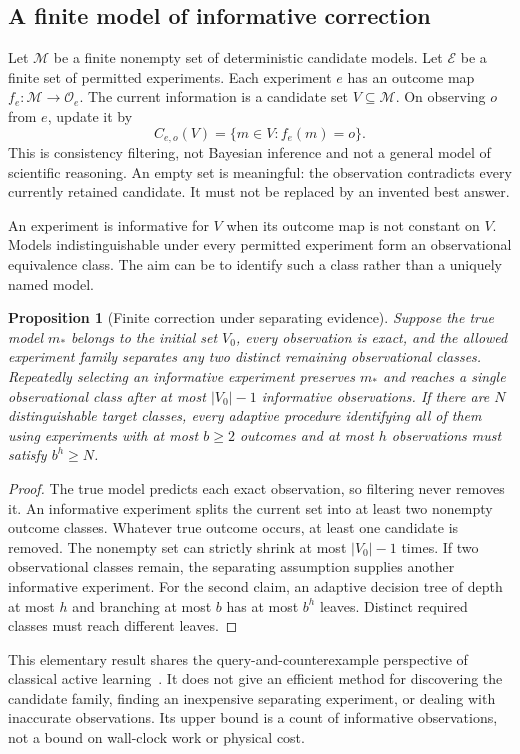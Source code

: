 \documentclass[11pt,letterpaper]{article}
\theoremstyle{plain}
\newtheorem{proposition}[theorem]{Proposition}
\theoremstyle{definition}
\newcommand{\M}{\mathcal M}\newcommand{\E}{\mathbb E}
\begin{document}
\subsection{A finite model of informative correction}
Let $\M$ be a finite nonempty set of deterministic candidate models. Let $\mathcal E$ be a finite set of permitted experiments. Each experiment $e$ has an outcome map $f_e:\M\to\mathcal O_e$. The current information is a candidate set $V\subseteq\M$. On observing $o$ from $e$, update it by
\begin{equation}\label{eq:filter}
C_{e,o}(V)=\{m\in V:f_e(m)=o\}.
\end{equation}
This is consistency filtering, not Bayesian inference and not a general model of scientific reasoning. An empty set is meaningful: the observation contradicts every currently retained candidate. It must not be replaced by an invented best answer.

An experiment is informative for $V$ when its outcome map is not constant on $V$. Models indistinguishable under every permitted experiment form an observational equivalence class. The aim can be to identify such a class rather than a uniquely named model.

\begin{proposition}[Finite correction under separating evidence]\label{prop:queries}
Suppose the true model $m_*$ belongs to the initial set $V_0$, every observation is exact, and the allowed experiment family separates any two distinct remaining observational classes. Repeatedly selecting an informative experiment preserves $m_*$ and reaches a single observational class after at most $|V_0|-1$ informative observations. If there are $N$ distinguishable target classes, every adaptive procedure identifying all of them using experiments with at most $b\geq2$ outcomes and at most $h$ observations must satisfy $b^h\geq N$.
\end{proposition}
\begin{proof}
The true model predicts each exact observation, so filtering never removes it. An informative experiment splits the current set into at least two nonempty outcome classes. Whatever true outcome occurs, at least one candidate is removed. The nonempty set can strictly shrink at most $|V_0|-1$ times. If two observational classes remain, the separating assumption supplies another informative experiment. For the second claim, an adaptive decision tree of depth at most $h$ and branching at most $b$ has at most $b^h$ leaves. Distinct required classes must reach different leaves.
\end{proof}
This elementary result shares the query-and-counterexample perspective of classical active learning~\cite{angluin}. It does not give an efficient method for discovering the candidate family, finding an inexpensive separating experiment, or dealing with inaccurate observations. Its upper bound is a count of informative observations, not a bound on wall-clock work or physical cost.
\end{document}
